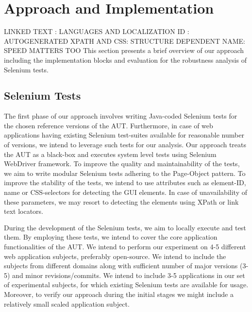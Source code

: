 \chapter{Approach and Implementation} %

\label{Chapter5} %


LINKED TEXT : LANGUAGES AND LOCALIZATION 
ID : AUTOGENERATED
XPATH AND CSS: STRUCTURE DEPENDENT
NAME: 
SPEED MATTERS TOO 
This section presents a brief overview of our approach including the  implementation blocks and evaluation for the robustness analysis of Selenium tests.

\section{Selenium Tests}
\label{sec:WritingTests}
\vspace{-2mm} The first phase of our approach involves writing Java-coded Selenium tests for the chosen reference versions of the AUT. Furthermore, in case of web applications having existing Selenium test-suites available for reasonable number of versions, we intend to leverage such tests for our analysis. Our approach treats the AUT as a black-box and executes system level tests using Selenium WebDriver framework. To improve the quality and maintainability of the tests, we aim to write modular Selenium tests adhering to the Page-Object pattern. To improve the stability of the tests, we intend to use attributes such as element-ID, name or CSS-selectors for detecting the GUI elements. In case of unavailability of these parameters, we may resort to detecting the elements using XPath or link text locators. 

During the development of the Selenium tests, we aim to locally execute and test them.  By employing these tests, we intend to cover the core application functionalities of the AUT. We intend to perform our experiment on 4-5 different web application subjects, preferably open-source. We intend to include the subjects from different domains along with sufficient number of major versions (3-5) and minor revisions/commits. We intend to include 3-5 applications in our set of experimental subjects, for which existing Selenium tests are available for usage. Moreover, to verify our approach during the initial stages we might include a relatively small scaled application subject.

